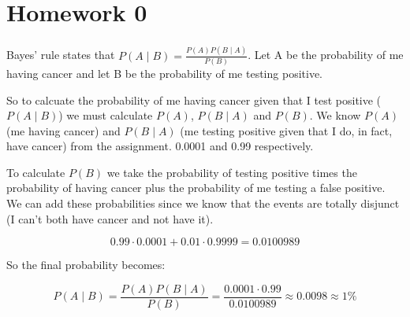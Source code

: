 \documentclass{article}
\begin{document}
\setcounter{section}{1}
\chapter{Homework 0}
\subsection{}

Bayes' rule states that $P(A\mid B) = \frac{P(A)P(B\mid A)}{P(B)}$. Let A be the
probability of me having cancer and let B be the probability of me testing
positive.

So to calcuate the probability of me having cancer given that I test positive
($P(A\mid B)$) we must calculate $P(A)$, $P(B\mid A)$ and $P(B)$.  We know
$P(A)$ (me having cancer) and $P(B\mid A)$ (me testing positive given that I
do, in fact, have cancer) from the assignment. 0.0001 and 0.99 respectively.

To calculate $P(B)$ we take the probability of testing positive times the
probability of having cancer plus the probability of me testing a false
positive. We can add these probabilities since we know that the events are
totally disjunct (I can't both have cancer and not have it).

\begin{equation*}
0.99 \cdot 0.0001 + 0.01 \cdot 0.9999 = 0.0100989
\end{equation*}

So the final probability becomes:

\begin{equation*}
  P(A\mid B) = \frac{P(A)P(B\mid A)}{P(B)} =
  \frac{0.0001 \cdot 0.99}{0.0100989} \approx 0.0098 \approx 1\%
\end{equation*}

\subsection{}
\end{document}
